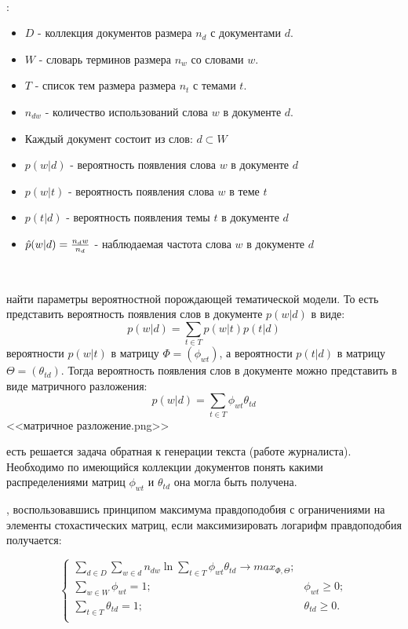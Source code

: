 ~\

:

\begin{itemize}
    \item $D$ - коллекция документов размера $n_d$ с документами $d$.
    \item $W$ - словарь терминов размера $n_w$ со словами $w$.
    \item $T$ - список тем размера размера $n_t$ с темами $t$.
    \item $n_{dw}$ - количество использований слова $w$ в документе $d$.
    \item Каждый документ состоит из слов: $d \subset W$
    \item $p(w|d)$ - вероятность появления слова $w$ в документе $d$
    \item $p(w|t)$ - вероятность появления слова $w$ в теме $t$
    \item $p(t|d)$ - вероятность появления темы $t$ в документе $d$
    \item $\hat{p}(w|d) = {{n_dw}\over{n_d}}$ - наблюдаемая частота слова $w$ в документе $d$
\end{itemize}

~\

 найти параметры вероятностной порождающей тематической модели. То есть представить вероятность появления слов в документе $p(w|d)$ в виде:
$$
p(w|d) = \sum_{t \in T}{ p(w|t) p(t|d) }
$$
 вероятности $p(w|t)$ в матрицу $\Phi=(\phi_{wt})$, а вероятности $p(t|d)$ в матрицу $\Theta=(\theta_{td})$. Тогда вероятность появления слов в документе можно представить в виде матричного разложения:
$$
p(w|d) = \sum_{t \in T}{ \phi_{wt} \theta_{td} }
$$
<<матричное разложение.png>>

 есть решается задача обратная к генерации текста (работе журналиста). Необходимо по имеющийся коллекции документов понять какими распределениями матриц $\phi_{wt}$ и $\theta_{td}$ она могла быть получена.


, воспользовавшись принципом максимума правдоподобия с ограничениями на элементы стохастических матриц, если максимизировать  логарифм правдоподобия получается:

$$ 
\begin{cases}
    \sum_{d \in D} \sum_{w \in d} n_{dw} \ln{\sum_{t \in T} \phi_{wt} \theta_{td} } \rightarrow max_{\Phi,\Theta};\\
    \sum_{w \in W}\phi_{wt} = 1; &\phi_{wt} \ge 0;\\
    \sum_{t \in T}\theta_{td} = 1; &\theta_{td} \ge 0.\\
\end{cases}
$$

